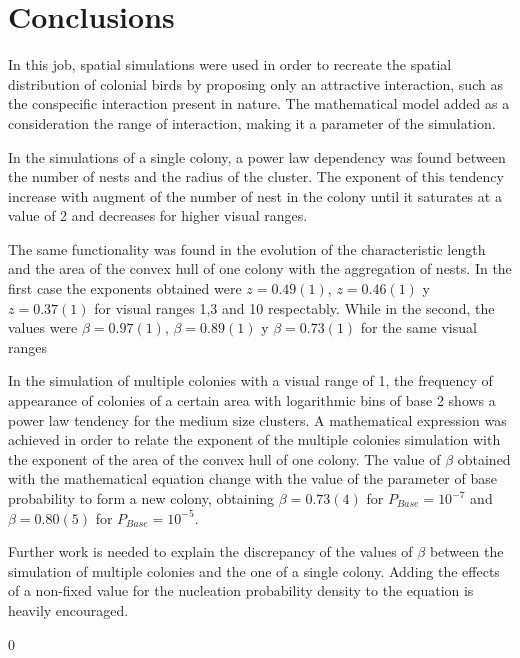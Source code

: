 \documentclass[aps,twocolumn,pre]{revtex4-2}
\begin{document}
\section{Conclusions}

In this job, spatial simulations were used in order to recreate the spatial distribution of colonial birds by proposing only an attractive interaction, such as the conspecific interaction present in nature. The mathematical model added as a consideration the range of interaction, making it a parameter of the simulation.

In the simulations of a single colony, a power law dependency was found between the number of nests and the radius of the cluster. The exponent of this tendency increase with augment of the number of nest in the colony until it saturates at a value of 2 and decreases for higher visual ranges.

The same functionality was found in the evolution of the characteristic length and the area of the convex hull of one colony with the aggregation of nests. In the first case the exponents obtained were $z=0.49(1)$, $z=0.46(1)$ y $z=0.37(1)$ for visual ranges 1,3 and 10 respectably. While in the second, the values were $\beta=0.97(1)$, $\beta=0.89(1)$ y $\beta=0.73(1)$ for the same visual ranges


In the simulation of multiple colonies with a visual range of 1, the frequency of appearance of colonies of a certain area with logarithmic bins of base 2 shows a power law tendency for the medium size clusters. A mathematical expression was achieved in order to relate the exponent of the multiple colonies simulation with the exponent of the area of the convex hull of one colony. The value of $\beta$ obtained with the mathematical equation change with the value of the parameter of base probability to form a new colony, obtaining $\beta=0.73(4)$ for $P_{Base}=10^{-7}$ and $\beta=0.80(5)$ for $P_{Base}=10^{-5}$.

Further work is needed to explain the discrepancy of the values of $\beta$ between the simulation of multiple colonies and the one of a single colony. Adding the effects of a non-fixed value for the nucleation probability density to the equation is heavily encouraged.








\onecolumngrid

\newpage
\appendix

\renewcommand{\thefigure}{a\arabic{figure}}
\renewcommand{\thesubsection}{A\arabic{subsection}}
\setcounter {figure} {0}
\end{document}
